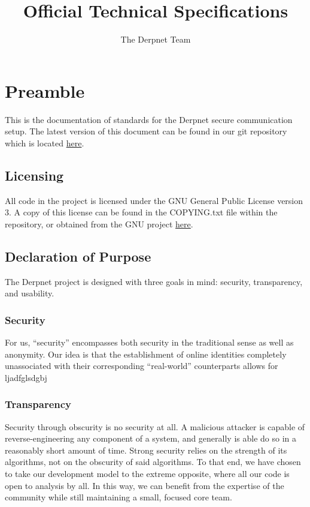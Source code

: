\documentclass[11pt]{article}
\title{Official Technical Specifications}
\author{The Derpnet Team}
\begin{document}
\maketitle

\section{Preamble}

This is the documentation of standards for the Derpnet secure communication
setup.  The latest version of this document can be found in our git
repository which is located \href{https://github.com/BUILDS-/Derpnet}{here}.

\subsection{Licensing}

All code in the project is licensed under the GNU General Public License
version 3.  A copy of this license can be found in the COPYING.txt file
within the repository, or obtained from the GNU project
\href{http://www.gnu.org/licenses/gpl.txt}{here}. 

\subsection{Declaration of Purpose}

The Derpnet project is designed with three goals in mind: security,
transparency, and usability.

\subsubsection{Security}

For us, ``security'' encompasses both security in the traditional sense as well
as anonymity.  Our idea is that the establishment of online identities
completely unassociated with their corresponding ``real-world'' counterparts
allows for ljadfglsdgbj

\subsubsection{Transparency}

Security through obscurity is no security at all.  A malicious attacker is
capable of reverse-engineering any component of a system, and generally is able
do so in a reasonably short amount of time.  Strong security relies on the
strength of its algorithms, not on the obscurity of said algorithms.  To that
end, we have chosen to take our development model to the extreme opposite, where
all our code is open to analysis by all.  In this way, we can benefit from the
expertise of the community while still maintaining a small, focused core team.
\end{document}
